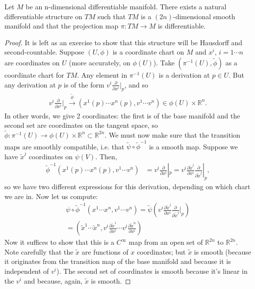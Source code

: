 \documentclass{../mathnotes}
\begin{document}
\begin{thm}
    Let $M$ be an n-dimensional differentiable manifold. There exists a natural differentiable structure on $TM$ 
    such that $TM$ is a $(2n)$-dimensional smooth manifold and that the projection map $\pi:TM\to M$ is differentiable.
\end{thm}
\begin{proof}
    It is left as an exercise to show that this structure will be Hausdorff and second-countable. Suppose $(U,\phi)$ is a coordinate chart on $M$
    and $x^i$, $i=1\cdots n$ are coordinates on $U$ (more accurately, on $\phi(U)$). Take $\left( \pi^{-1}(U),\tilde{\phi} \right)$ as a coordinate chart
    for $TM$. Any element in $\pi^{-1}(U)$ is a derivation at $p\in U$. But any derivation at $p$ is of the form $v^i\frac{\partial}{\partial x^i}|_p$,
    and so
    \begin{align*}
        v^i\frac{\partial}{\partial x^i}|_p\xrightarrow{\tilde{\phi}}\left( x^1(p)\cdots x^n(p),v^1 \cdots v^n \right)\in \phi(U)\times\mathbb{R}^n.
    \end{align*}
    In other words, we give 2 coordinates: the first is of the base manifold and the second set are coordinates on the tangent space, so
    $\tilde{\phi}:\pi^{-1}(U)\to\phi(U)\times \mathbb{R}^n\subset\mathbb{R}^{2n}$. We must now make sure that the transition maps 
    are smoothly compatible, i.e. that $\tilde{\psi}\circ\tilde{\phi}^{-1}$ is a smooth map. Suppose we have $\tilde{x}^j$ coordinates on $\psi(V)$.
    Then,
    \begin{align*}
        \tilde{\phi}^{-1}\left( x^1(p)\cdots x^n(p),v^1\cdots v^n \right)&=v^i\frac{\partial}{\partial x^i}|_p
        =v^i\frac{\partial \tilde{x}^j}{\partial x^i}\frac{\partial}{\partial \tilde{x}^j}|_p,
    \end{align*}
    so we have two different expressions for this derivation, depending on which chart we are in. Now let us compute:
    \begin{align*}
        \psi\circ\tilde{\phi}^{-1}\left( x^1\cdots x^n,v^1\cdots v^n \right)=\tilde{\psi}\left(v^i\frac{\partial \tilde{x}^j}{\partial x^i}\frac{\partial}{\partial \tilde{x}^j}|_p  \right)\\
        =\left( \tilde{x}^1\cdots \tilde{x}^n,v^i\frac{\partial \tilde{x}^1}{\partial x^i}\cdots v^i\frac{\partial \tilde{x}^n}{\partial x^i} \right)
    \end{align*}
    Now it suffices to show that this is a $C^\infty$ map from an open set of $\mathbb{R}^{2n}$ to $\mathbb{R}^{2n}$. Note carefully that the $\tilde{x}$ are functions of $x$
    coordinates; but $\tilde{x}$ is smooth (because it originates from the transition map of the base manifold and because it is independent of $v^i$). The second set
    of coordinates is smooth because it's linear in the $v^i$ and because, again, $\tilde{x}$ is smooth.
\end{proof}
\end{document}
